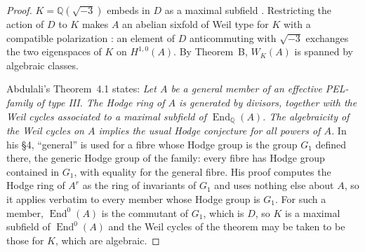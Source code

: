 \documentclass[11pt]{amsart}
\theoremstyle{definition}
\theoremstyle{remark}
\newcommand{\Q}{\mathbb Q}
\newcommand{\End}{\operatorname{End}}
\begin{document}
\begin{proof}
$K=\Q(\sqrt{-3})$ embeds in $D$ as a maximal subfield \cite[Proposition~14.6.7]{Voight}. Restricting the action of $D$ to $K$ makes $A$ an abelian sixfold of Weil type for $K$ with a compatible polarization \cite[\S4]{Abdulali}: an element of $D$ anticommuting with $\sqrt{-3}$ exchanges the two eigenspaces of $K$ on $H^{1,0}(A)$. By Theorem~B, $W_K(A)$ is spanned by algebraic classes.

Abdulali's Theorem~4.1 \cite[p.~673]{Abdulali} states: \emph{Let $A$ be a general member of an effective PEL-family of type III. The Hodge ring of $A$ is generated by divisors, together with the Weil cycles associated to a maximal subfield of $\End_\Q(A)$. The algebraicity of the Weil cycles on $A$ implies the usual Hodge conjecture for all powers of $A$.} In his \S4, ``general'' is used for a fibre whose Hodge group is the group $G_1$ defined there, the generic Hodge group of the family: every fibre has Hodge group contained in $G_1$, with equality for the general fibre. His proof computes the Hodge ring of $A^r$ as the ring of invariants of $G_1$ and uses nothing else about $A$, so it applies verbatim to every member whose Hodge group is $G_1$. For such a member, $\End^0(A)$ is the commutant of $G_1$, which is $D$, so $K$ is a maximal subfield of $\End^0(A)$ and the Weil cycles of the theorem may be taken to be those for $K$, which are algebraic.
\end{proof}
\end{document}
